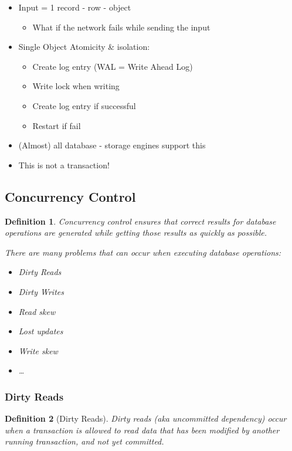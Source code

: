 \documentclass{article}
\newtheorem{theorem}{Definition}[section]
\begin{document}
\begin{itemize}
    \item Input = 1 record - row - object
    \begin{itemize}
        \item What if the network fails while sending the input
    \end{itemize}
    \item Single Object Atomicity \& isolation:
    \begin{itemize}
        \item Create log entry (WAL = Write Ahead Log)
        \item Write lock when writing
        \item Create log entry if successful
        \item Restart if fail
    \end{itemize}
    \item (Almost) all database - storage engines support this
    \item This is not a transaction!
\end{itemize}

\subsection{Concurrency Control}

\begin{theorem}
    Concurrency control ensures that correct results for database operations are generated
    while getting those results as quickly as possible.

    There are many problems that can occur when executing database operations:

    \begin{itemize}
        \item Dirty Reads
        \item Dirty Writes
        \item Read skew
        \item Lost updates
        \item Write skew
        \item \dots
    \end{itemize}
\end{theorem}

\subsubsection{Dirty Reads}

\begin{theorem}[Dirty Reads]
Dirty reads (aka uncommitted dependency) occur when a transaction is allowed 
to read data that has been modified by another running transaction, 
and not yet committed.
\end{theorem}
\end{document}
